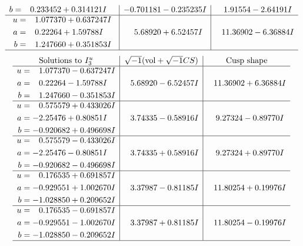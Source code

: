 \documentclass[1p]{elsarticle_modified}
\theoremstyle{definition}
\newcommand{\I}{\sqrt{-1}}
\begin{document}
$$\begin{array}{c|c|c}
\begin{aligned}
b &= \phantom{-}0.233452 + 0.314121 I\end{aligned}
 & -0.701181 - 0.235235 I & \phantom{-}1.91554 - 2.64191 I \\ \hline\begin{aligned}
u &= \phantom{-}1.077370 + 0.637247 I \\
a &= \phantom{-}0.22264 + 1.59788 I \\
b &= \phantom{-}1.247660 + 0.351853 I\end{aligned}
 & \phantom{-}5.68920 + 6.52457 I & \phantom{-}11.36902 - 6.36884 I\\
 \hline 
 \end{array}$$\newpage$$\begin{array}{c|c|c}  
\text{Solutions to }I^u_{3}& \I (\text{vol} + \sqrt{-1}CS) & \text{Cusp shape}\\
 \hline 
\begin{aligned}
u &= \phantom{-}1.077370 - 0.637247 I \\
a &= \phantom{-}0.22264 - 1.59788 I \\
b &= \phantom{-}1.247660 - 0.351853 I\end{aligned}
 & \phantom{-}5.68920 - 6.52457 I & \phantom{-}11.36902 + 6.36884 I \\ \hline\begin{aligned}
u &= \phantom{-}0.575579 + 0.433026 I \\
a &= -2.25476 + 0.80851 I \\
b &= -0.920682 + 0.496698 I\end{aligned}
 & \phantom{-}3.74335 - 0.58916 I & \phantom{-}9.27324 - 0.89770 I \\ \hline\begin{aligned}
u &= \phantom{-}0.575579 - 0.433026 I \\
a &= -2.25476 - 0.80851 I \\
b &= -0.920682 - 0.496698 I\end{aligned}
 & \phantom{-}3.74335 + 0.58916 I & \phantom{-}9.27324 + 0.89770 I \\ \hline\begin{aligned}
u &= \phantom{-}0.176535 + 0.691857 I \\
a &= -0.929551 + 1.002670 I \\
b &= -1.028850 + 0.209652 I\end{aligned}
 & \phantom{-}3.37987 - 0.81185 I & \phantom{-}11.80254 + 0.19976 I \\ \hline\begin{aligned}
u &= \phantom{-}0.176535 - 0.691857 I \\
a &= -0.929551 - 1.002670 I \\
b &= -1.028850 - 0.209652 I\end{aligned}
 & \phantom{-}3.37987 + 0.81185 I & \phantom{-}11.80254 - 0.19976 I\\
 \hline 
 \end{array}$$\newpage
\end{document}
